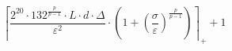 \[\left\lceil \frac{2^{20} \cdot 132^{\frac{p}{p - 1}} \cdot L \cdot d \cdot \Delta}{\varepsilon^{2}} \cdot \left(1 + \left(\frac{\sigma}{\varepsilon}\right)^{\frac{p}{p - 1}}\right) \right\rceil_{+} + 1\]

